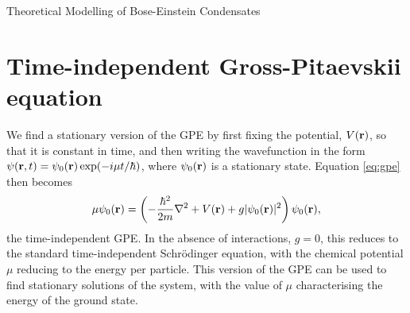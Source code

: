 \begin{chapter}{\label{cha:theoretical_model}Theoretical Modelling of Bose-Einstein Condensates}
\section{\label{section:gpestationary} Time-independent Gross-Pitaevskii equation}
 We find a stationary version of the GPE by first fixing the potential, $V({\bf r})$, so that it is constant in time, and then writing the wavefunction in the form $\psi({\bf r},t) = \psi_0({\bf r}) \exp (-i\mu t / \hbar)$, where $\psi_0({\bf r})$ is a stationary state. Equation \ref{eq:gpe} then becomes
	\begin{equation}\label{eq:stationgpe}
		\mu\psi_0({\bf r}) = \left( -\frac{\hbar^2}{2m}\nabla^2 + V({\bf r}) + g|\psi_0({\bf r})|^2  \right) \psi_0({\bf r}),
	\end{equation}
	the time-independent GPE. In the absence of interactions, $g=0$, this reduces to the standard time-independent Schr\"odinger equation, with the chemical potential $\mu$ reducing to the energy per particle. This version of the GPE can be used to find stationary solutions of the system, with the value of $\mu$ characterising the energy of the ground state.


\end{chapter}
